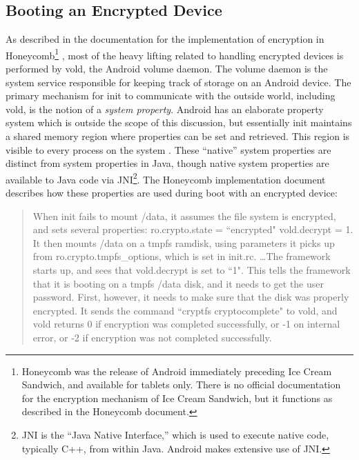 \subsection{Booting an Encrypted Device} \label{ssec:encryptionboot}

As described in the documentation for the implementation of encryption in Honeycomb\footnote{Honeycomb was the release of Android
immediately preceding Ice Cream Sandwich, and available for tablets only. There is no official documentation for the encryption
mechanism of Ice Cream Sandwich, but it functions as described in the Honeycomb document.} \cite{honeycombcrypt}, most of the heavy
lifting related to handling encrypted devices is performed by vold, the Android volume daemon. The volume daemon is the
system service responsible for keeping track of storage on an Android device. The primary mechanism for init to communicate
with the outside world, including vold, is the notion of a \emph{system property}.  Android has an elaborate property system
which is outside the scope of this discussion, but essentially init maintains a shared memory region where properties can
be set and retrieved. This region is visible to every process on the system \cite{propertysystem}. These ``native'' system
properties are distinct from system properties in Java, though native system properties are available to Java code via
JNI\footnote{JNI is the ``Java Native Interface,'' which is used to execute native code, typically C++, from within Java. Android
makes extensive use of JNI.}. The Honeycomb implementation document describes how these properties are used during boot with an
encrypted device:

\begin{quote} When init fails to mount /data, it assumes the file system is encrypted, and sets several properties: ro.crypto.state =
``encrypted" vold.decrypt = 1. It then mounts /data on a tmpfs ramdisk, using parameters it picks up from ro.crypto.tmpfs\_options,
which is set in init.rc.  \ldots The framework starts up, and sees that vold.decrypt is set to ``1". This tells the framework that it
is booting on a tmpfs /data disk, and it needs to get the user password. First, however, it needs to make sure that the disk was
properly encrypted. It sends the command ``cryptfs cryptocomplete" to vold, and vold returns 0 if encryption was completed
successfully, or -1 on internal error, or -2 if encryption was not completed successfully. \cite{honeycombcrypt}
\end{quote}

